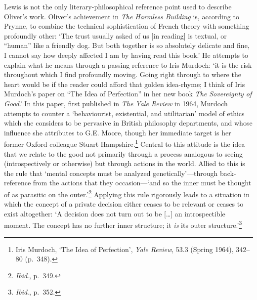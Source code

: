 \documentclass[]{article}
\begin{document}
Lewis is not the only literary-philosophical reference point used to
describe Oliver’s work. Oliver’s achievement in \emph{The Harmless
Building} is, according to Prynne, to combine the technical
sophistication of French theory with something profoundly other: ‘The
trust usually asked of us {[}in reading{]} is textual, or “human” like a
friendly dog. But both together is so absolutely delicate and fine, I
cannot say how deeply affected I am by having read this book.’ He
attempts to explain what he means through a passing reference to Iris
Murdoch: ‘it is the risk throughout which I find profoundly moving.
Going right through to where the heart would be if the reader could
afford that golden idea-rhyme; I think of Iris Murdoch’s paper on “The
Idea of Perfection” in her new book \emph{The Sovereignty of Good}.’ In
this paper, first published in \emph{The Yale Review} in 1964, Murdoch
attempts to counter a ‘behaviourist, existential, and utilitarian’ model
of ethics which she considers to be pervasive in British philosophy
departments, and whose influence she attributes to G.E. Moore, though
her immediate target is her former Oxford colleague Stuart
Hampshire.\footnote{Iris Murdoch, ‘The Idea of Perfection’, \emph{Yale
  Review}, 53.3 (Spring 1964), 342–80 (p.~348).} Central to this
attitude is the idea that we relate to the good not primarily through a
process analogous to seeing (introspectively or otherwise) but through
actions in the world. Allied to this is the rule that ‘mental concepts
must be analyzed genetically’—through back-reference from the actions
that they occasion—‘and so the inner must be thought of as parasitic on
the outer.’\footnote{\emph{Ibid}., p.~349.} Applying this rule
rigorously leads to a situation in which the concept of a private
decision either ceases to be relevant or ceases to exist altogether: ‘A
decision does not turn out to be {[}\ldots{}{]} an introspectible
moment. The concept has no further inner structure; it \emph{is} its
outer structure.’\footnote{\emph{Ibid}., p.~352.}
\end{document}
